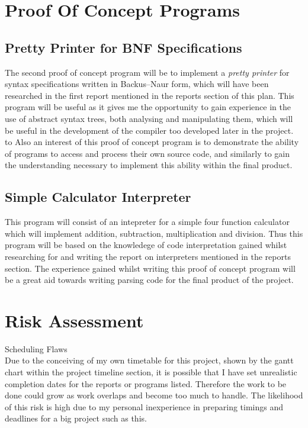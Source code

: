 \documentclass[a4paper, 11pt]{article}
\begin{document}
\newpage

\section{Proof Of Concept Programs}

\subsection{Pretty Printer for BNF Specifications}
The second proof of concept program will be to implement a \textit{pretty printer} for syntax specifications written in Backus–Naur form, which will have been researched in the first report mentioned in the reports section of this plan. This program will be useful as it gives me the opportunity to gain experience in the use of abstract syntax trees, both analysing and manipulating them, which will be useful in the development of the compiler too developed later in the project. to Also an interest of this proof of concept program is to demonstrate the ability of programs to access and process their own source code, and similarly to gain the understanding necessary to implement this ability within the final product.

\subsection{Simple Calculator Interpreter}
This program will consist of an intepreter for a simple four function calculator which will implement addition, subtraction, multiplication and division. Thus this program will be based on the knowledege of code interpretation gained whilst researching for and writing the report on interpreters mentioned in the reports section. The experience gained whilst writing this proof of concept program will be a great aid towards writing parsing code for the final product of the project.

\newpage

\section{Risk Assessment}

\textbullet\space Scheduling Flaws\\
Due to the conceiving of my own timetable for this project, shown by the gantt chart within the project timeline section, it is possible that I have set unrealistic completion dates for the reports or programs listed. Therefore the work to be done could grow as work overlaps and become too much to handle. The likelihood of this risk is high due to my personal inexperience in preparing timings and deadlines for a big project such as this.
\end{document}
